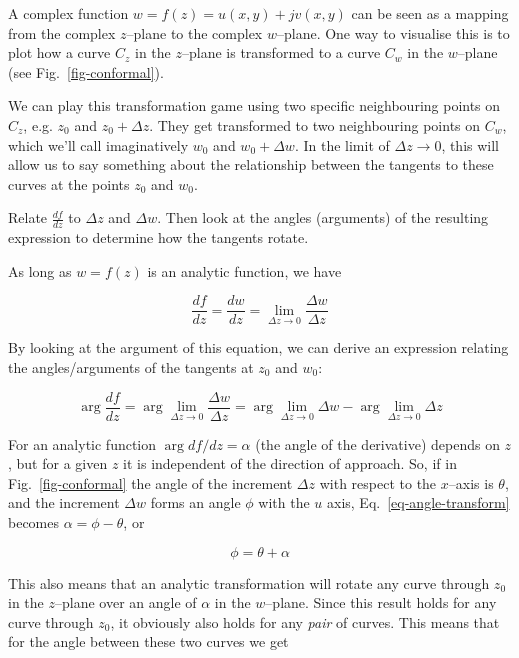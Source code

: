 A complex function $w = f(z) = u(x,y)+jv(x,y)$ can be seen as a mapping from the complex $z$--plane to the complex $w$--plane. One way to visualise this is to plot how a curve $C_z$ in the $z$--plane is transformed to a curve $C_w$ in the $w$--plane (see Fig.~\ref{fig-conformal}).

We can play this transformation game using two specific neighbouring points on $C_z$, e.g. $z_0$ and $z_0+\Delta z$. They get transformed to two neighbouring points on $C_w$, which we'll call imaginatively $w_0$ and $w_0+\Delta w$. In the limit of $\Delta z \to 0$, this will allow us to say something about the relationship between the tangents to these curves at the points $z_0$ and $w_0$.

\begin{cue}
Relate $\frac{df}{dz}$ to $\Delta z$ and $\Delta w$. Then look at the angles (arguments) of the resulting expression to determine how the tangents rotate.
\end{cue}

As long as $w=f(z)$ is an analytic function, we have

\begin{equation}
\frac{df}{dz} = \frac{dw}{dz} = \lim_{\Delta z \to 0} \frac{\Delta w}{\Delta z}
\end{equation}

By looking at the argument of this equation, we can derive an expression relating the angles/arguments of the tangents at $z_0$ and $w_0$:

\begin{equation}
\arg \frac{df}{dz} = \arg \lim_{\Delta z \to 0} \frac{\Delta w}{\Delta z} = \arg
\lim_{\Delta z   \to 0} \Delta w - \arg \lim_{\Delta z \to 0} \Delta z
\label{eq-angle-transform}
\end{equation} 

For an analytic function $\arg df / dz = \alpha$ (the angle of the derivative) depends on $z$, but for a given $z$ it is independent of the direction of approach. So, if in Fig.~\ref{fig-conformal} the angle of the increment $\Delta z$ with respect to the $x$--axis is $\theta$, and the increment $\Delta w$ forms an angle $\phi$ with the $u$ axis, Eq.~\ref{eq-angle-transform} becomes $\alpha = \phi - \theta $, or

\begin{equation}
\phi = \theta + \alpha
\end{equation}

This also means that an analytic transformation will rotate any curve through $z_0$ in the $z$--plane over an angle of $\alpha$ in the $w$--plane. Since this result holds for any curve through $z_0$, it obviously also holds for any \emph{pair} of curves. This means that for the angle between these two curves we get

